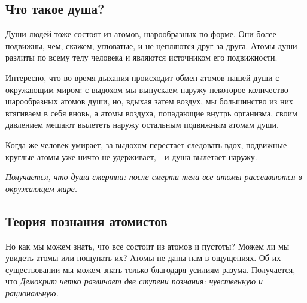 \documentclass[
]{article}
\begin{document}
\hypertarget{ux447ux442ux43e-ux442ux430ux43aux43eux435-ux434ux443ux448ux430}{%
\subsection{Что такое
душа?}\label{ux447ux442ux43e-ux442ux430ux43aux43eux435-ux434ux443ux448ux430}}

Души людей тоже состоят из атомов, шарообразных по форме. Они более
подвижны, чем, скажем, угловатые, и не цепляются друг за друга. Атомы
души разлиты по всему телу человека и являются источником его
подвижности.

Интересно, что во время дыхания происходит обмен атомов нашей души с
окружающим миром: с выдохом мы выпускаем наружу некоторое количество
шарообразных атомов души, но, вдыхая затем воздух, мы большинство из них
втягиваем в себя вновь, а атомы воздуха, попадающие внутрь организма,
своим давлением мешают вылететь наружу остальным подвижным атомам души.

Когда же человек умирает, за выдохом перестает следовать вдох, подвижные
круглые атомы уже ничто не удерживает, - и душа вылетает наружу.

\emph{Получается, что душа смертна: после смерти тела все атомы
рассеиваются в окружающем мире.}

\hypertarget{ux442ux435ux43eux440ux438ux44f-ux43fux43eux437ux43dux430ux43dux438ux44f-ux430ux442ux43eux43cux438ux441ux442ux43eux432}{%
\subsection{Теория познания
атомистов}\label{ux442ux435ux43eux440ux438ux44f-ux43fux43eux437ux43dux430ux43dux438ux44f-ux430ux442ux43eux43cux438ux441ux442ux43eux432}}

Но как мы можем знать, что все состоит из атомов и пустоты? Можем ли мы
увидеть атомы или пощупать их? Атомы не даны нам в ощущениях. Об их
существовании мы можем знать только благодаря усилиям разума.
Получается, что \emph{Демокрит четко различает две ступени познания:
чувственную и рациональную.}
\end{document}

